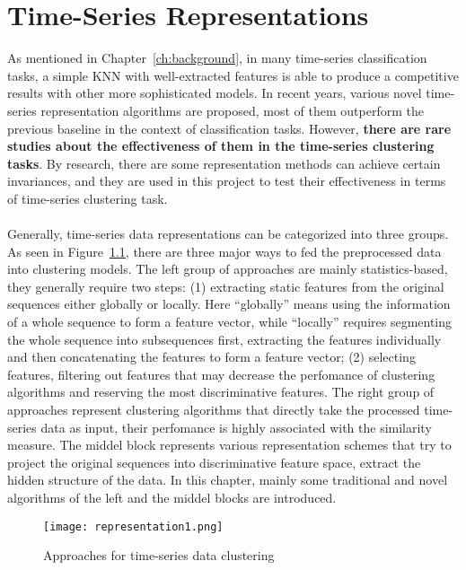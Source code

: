 \chapter{Time-Series Representations}
\label{cha:representation}
As mentioned in Chapter~\ref{ch:background}, in many time-series classification tasks, a simple KNN with well-extracted features is able to produce a competitive results with other more sophisticated models. In recent years, various novel time-series representation algorithms are proposed, most of them outperform the previous baseline in the context of classification tasks. However, \textbf{there are rare studies about the effectiveness of them in the time-series clustering tasks}. By research, there are some representation methods can achieve certain invariances, and they are used in this project to test their effectiveness in terms of time-series clustering task.\\
\\Generally, time-series data representations can be categorized into three groups. As seen in Figure~\ref{fig:representation1}, there are three major ways to fed the preprocessed data into clustering models. The left group of approaches are mainly statistics-based, they generally require two steps: (1) extracting static features from the original sequences either globally or locally. Here ``globally'' means using the information of a whole sequence to form a feature vector, while ``locally'' requires segmenting the whole sequence into subsequences first, extracting the features individually and then concatenating the features to form a feature vector; (2) selecting features, filtering out features that may decrease the perfomance of clustering algorithms and reserving the most discriminative features. The right group of approaches represent clustering algorithms that directly take the processed time-series data as input, their perfomance is highly associated with the similarity measure. The middel block represents various representation schemes that try to project the original sequences into discriminative feature space, extract the hidden structure of the data. In this chapter, mainly some traditional and novel algorithms of the left and the middel blocks are introduced.
\begin{figure}[!htbp]
    \centering
    \texttt{[image: representation1.png]}
    \caption{Approaches for time-series data clustering}
    \label{fig:representation1}
\end{figure} 

